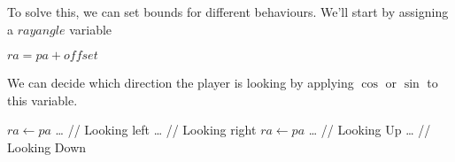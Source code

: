 \documentclass{article}
\begin{document}
To solve this, we can set bounds for different behaviours. We'll start by assigning a $rayangle$ variable

\begin{center}
    $ra = pa + offset$
\end{center}

We can decide which direction the player is looking by applying $\cos$ or $\sin$ to this variable.

\begin{center}
\begin{algorithmic}
    \State $ra \gets pa$
        \State \dots
        \State // Looking left
    \EndIf 
        \State \dots
        \State // Looking right
    \EndIf 
    \State $ra \gets pa$
        \State \dots
        \State // Looking Up
    \EndIf 
        \State \dots
        \State // Looking Down
    \EndIf 
    \end{algorithmic}
\end{center}
\end{document}
